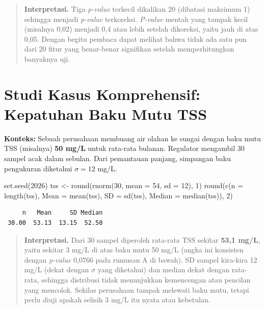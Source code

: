 \documentclass[
  indonesian,
  letterpaper,
]{book}
\newenvironment{Shaded}{\begin{snugshade}}{\end{snugshade}}
\newcommand{\AttributeTok}[1]{\textcolor[rgb]{0.40,0.45,0.13}{#1}}
\newcommand{\DecValTok}[1]{\textcolor[rgb]{0.68,0.00,0.00}{#1}}
\newcommand{\FunctionTok}[1]{\textcolor[rgb]{0.28,0.35,0.67}{#1}}
\newcommand{\NormalTok}[1]{\textcolor[rgb]{0.00,0.23,0.31}{#1}}
\newcommand{\OtherTok}[1]{\textcolor[rgb]{0.00,0.23,0.31}{#1}}
\begin{document}
\begin{quote}
\textbf{Interpretasi.} Tiga \emph{p-value} terkecil dikalikan 20
(dibatasi maksimum 1) sehingga menjadi \emph{p-value} terkoreksi.
\emph{P-value} mentah yang tampak kecil (misalnya 0,02) menjadi 0,4 atau
lebih setelah dikoreksi, yaitu jauh di atas 0,05. Dengan begitu pembaca
dapat melihat bahwa tidak ada satu pun dari 20 fitur yang benar-benar
signifikan setelah memperhitungkan banyaknya uji.
\end{quote}

\section{Studi Kasus Komprehensif: Kepatuhan Baku Mutu
TSS}\label{studi-kasus-komprehensif-kepatuhan-baku-mutu-tss}

\textbf{Konteks:} Sebuah perusahaan membuang air olahan ke sungai dengan
baku mutu TSS (misalnya) \textbf{50 mg/L} untuk rata-rata bulanan.
Regulator mengambil 30 sampel acak dalam sebulan. Dari pemantauan
panjang, simpangan baku pengukuran diketahui \(\sigma = 12\) mg/L.

\begin{Shaded}
\begin{Highlighting}[]
\FunctionTok{set.seed}\NormalTok{(}\DecValTok{2026}\NormalTok{)}
\NormalTok{tss }\OtherTok{\textless{}{-}} \FunctionTok{round}\NormalTok{(}\FunctionTok{rnorm}\NormalTok{(}\DecValTok{30}\NormalTok{, }\AttributeTok{mean =} \DecValTok{54}\NormalTok{, }\AttributeTok{sd =} \DecValTok{12}\NormalTok{), }\DecValTok{1}\NormalTok{)}
\FunctionTok{round}\NormalTok{(}\FunctionTok{c}\NormalTok{(}\AttributeTok{n =} \FunctionTok{length}\NormalTok{(tss), }\AttributeTok{Mean =} \FunctionTok{mean}\NormalTok{(tss), }\AttributeTok{SD =} \FunctionTok{sd}\NormalTok{(tss), }\AttributeTok{Median =} \FunctionTok{median}\NormalTok{(tss)), }\DecValTok{2}\NormalTok{)}
\end{Highlighting}
\end{Shaded}

\begin{verbatim}
     n   Mean     SD Median 
 30.00  53.13  13.15  52.50 
\end{verbatim}

\begin{quote}
\textbf{Interpretasi.} Dari 30 sampel diperoleh rata-rata TSS sekitar
\textbf{53,1 mg/L}, yaitu sekitar 3 mg/L di atas baku mutu 50 mg/L
(angka ini konsisten dengan \emph{p-value} 0,0766 pada rumusan A di
bawah). SD sampel kira-kira 12 mg/L (dekat dengan \(\sigma\) yang
diketahui) dan median dekat dengan rata-rata, sehingga distribusi tidak
menunjukkan kemencengan atau pencilan yang mencolok. Sekilas perusahaan
tampak melewati baku mutu, tetapi perlu diuji apakah selisih 3 mg/L itu
nyata atau kebetulan.
\end{quote}
\end{document}
